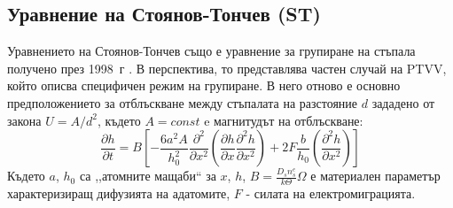 \subsection{Уравнение на Стоянов-Тончев (ST)}
Уравнението на Стоянов-Тончев също е уравнение за групиране на стъпала получено през 1998~г \cite{StoyanovTonchev}. В перспектива, то представлява частен случай на PTVV, който описва специфичен режим на групиране. В него отново е основно предположението за отблъскване между стъпалата на разстояние $d$ зададено от закона $U = A/d^2$, където $A = const$ e магнитудът на отблъскване:
\begin{equation}
    \label{eq:stoyanov_tonchev_dimensional}
    \frac{\partial h}{\partial t} = B \left[ - \frac{6 a^2 A}{h^2_0} \frac{\partial^2}{\partial x^2} \left( \frac{\partial h}{\partial x} \frac{\partial^2 h}{\partial x^2}  \right) + 2 F \frac{b}{h_0} \left( \frac{\partial^2 h}{\partial x^2}  \right) \right] 
\end{equation}
Където $a$, $h_0$ са ,,атомните мащаби`` за $x$, $h$, $B = \frac{D_s n^e_s}{k \Theta} \Omega$ е материален параметър характеризиращ дифузията на адатомите, $F$ - силата на електромиграцията.

